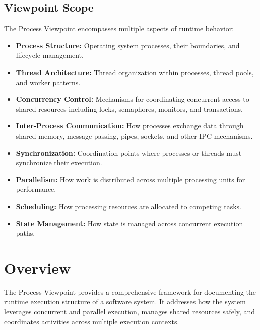 \documentclass[11pt,letterpaper]{article}
\begin{document}
\subsection{Viewpoint Scope}

The Process Viewpoint encompasses multiple aspects of runtime behavior:

\begin{itemize}
    \item \textbf{Process Structure:} Operating system processes, their boundaries, and lifecycle management.
    
    \item \textbf{Thread Architecture:} Thread organization within processes, thread pools, and worker patterns.
    
    \item \textbf{Concurrency Control:} Mechanisms for coordinating concurrent access to shared resources including locks, semaphores, monitors, and transactions.
    
    \item \textbf{Inter-Process Communication:} How processes exchange data through shared memory, message passing, pipes, sockets, and other IPC mechanisms.
    
    \item \textbf{Synchronization:} Coordination points where processes or threads must synchronize their execution.
    
    \item \textbf{Parallelism:} How work is distributed across multiple processing units for performance.
    
    \item \textbf{Scheduling:} How processing resources are allocated to competing tasks.
    
    \item \textbf{State Management:} How state is managed across concurrent execution paths.
\end{itemize}

\section{Overview}

The Process Viewpoint provides a comprehensive framework for documenting the runtime execution structure of a software system. It addresses how the system leverages concurrent and parallel execution, manages shared resources safely, and coordinates activities across multiple execution contexts.
\end{document}
